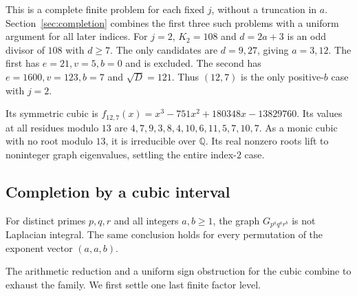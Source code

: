 This is a complete finite problem for each fixed $j$, without a
truncation in $a$. Section~\ref{sec:completion} combines the first
three such problems with a uniform argument for all later indices.
For $j=2$, $K_2=108$ and $d=2a+3$ is an odd divisor of $108$ with
$d\geq7$. The only candidates are $d=9,27$, giving $a=3,12$.
The first has $e=21,v=5,b=0$ and is excluded. The second has
$e=1600,v=123,b=7$ and $\sqrt D=121$.
Thus $(12,7)$ is the only positive-$b$ case with $j=2$.

Its symmetric cubic is $f_{12,7}(x)=x^3-751x^2+180348x-13829760$.
Its values at all residues modulo $13$ are
$4,7,9,3,8,4,10,6,11,5,7,10,7$.
As a monic cubic with no root modulo $13$, it is irreducible over
$\mathbb Q$. Its real nonzero roots lift to noninteger graph eigenvalues,
settling the entire index-$2$ case.

\subsection{Completion by a cubic interval}

\begin{theorem}
\label{thm:repeated}
For distinct primes $p,q,r$ and all integers $a,b\geq1$, the graph
$G_{p^a q^a r^b}$ is not Laplacian integral. The same conclusion holds
for every permutation of the exponent vector $(a,a,b)$.
\end{theorem}

The arithmetic reduction and a uniform sign obstruction for the cubic
combine to exhaust the family. We first settle one last finite factor level.

